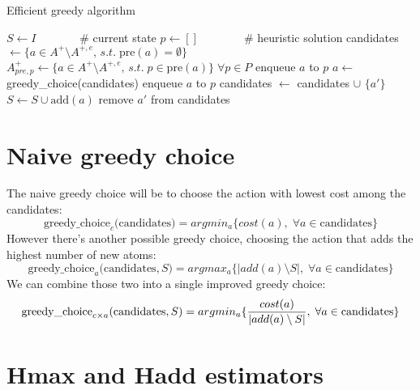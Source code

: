 \begin{algorithm}[h]
    \caption{Efficient greedy algorithm}
    \begin{algorithmic}
        \State $S\gets I\qquad\quad\;\;\;$\# current state
        \State $p\gets []\qquad\qquad$\# heuristic solution
        \State candidates $\gets\{a\in A^+\setminus A^{+,e},\,s.t.\;\mbox{pre}(a)=\emptyset\}$
        \State $A^+_{pre,p}\gets\{a\in A^+\setminus A^{+,e},\,s.t.\;p\in\mbox{pre}(a)\}\;\forall p\in P$
                \State enqueue $a$ to $p$
            \Else
                \State $a\gets$ greedy\_choice(candidates)
                \State enqueue $a$ to $p$
            \EndIf
                        \State candidates $\gets$ candidates $\cup$ $\{a'\}$
                    \EndIf
                \EndFor
            \EndFor
            \State $S\gets S\cup\mbox{add}(a)$
                    \State remove $a'$ from candidates
                \EndIf
            \EndFor
        \EndWhile
    \end{algorithmic}
\end{algorithm}

\section{Naive greedy choice}
The naive greedy choice will be to choose the action with lowest cost among the candidates:
$$\mbox{greedy\_choice}_c\mbox{(candidates)}=argmin_a\{cost(a),\;\forall a\in\mbox{candidates}\}$$
However there's another possible greedy choice, choosing the action that adds the highest number of new atoms:
$$\mbox{greedy\_choice}_a\mbox{(candidates},S)=argmax_a\{|add(a)\setminus S|,\;\forall a\in\mbox{candidates}\}$$
We can combine those two into a single improved greedy choice:
$$\mbox{greedy\_choice}_{c\times a}\mbox{(candidates},S)=argmin_a\{{cost(a)\over|add(a)\setminus S|},\;\forall a\in\mbox{candidates}\}$$

\section{Hmax and Hadd estimators}

